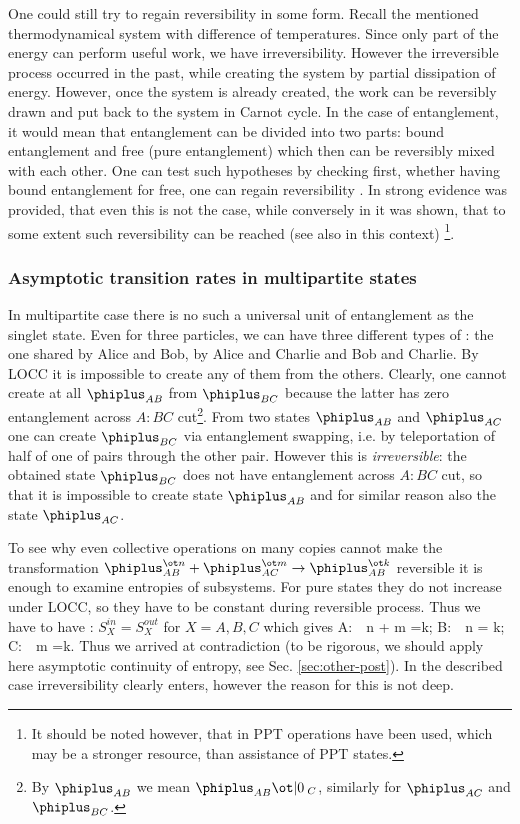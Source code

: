 \documentclass[twocolumn,aps,rmp]{revtex4}
\begin{document}
One could still try to regain reversibility in some form. Recall the
mentioned thermodynamical system with difference of temperatures.
Since only part of the energy can perform useful work, we have
irreversibility. However the irreversible process occurred in the
past, while creating the system by partial dissipation of energy.
However, once the system is already created, the work can be
reversibly drawn and put back to the system in Carnot cycle. In the
case of entanglement, it would mean that entanglement can be divided
into two parts: bound entanglement and free (pure entanglement)
which then can be reversibly mixed with each other. One can test
such hypotheses by checking first, whether having bound entanglement
for free, one can regain reversibility \cite{bound}. In
\cite{thermo-ent2002} strong evidence was provided, that even this
is not the case, while conversely in \cite{AudenaertPE2002-PPT} it
was shown, that to some extent such reversibility can be reached
(see also \cite{Ishizaka04} in this context)
\footnote{It should be noted however, that in \cite{AudenaertPE2002-PPT}
PPT operations have been used, which may be a stronger resource,
than assistance of PPT states.}.


\subsubsection{Asymptotic transition rates in multipartite states}
\label{subsubsec:ghz-epr}
In multipartite case there is no such a universal unit of entanglement as the singlet state.
Even for three particles, we can have three different types of \eprstates:
the one  shared by Alice and Bob, by Alice and Charlie
and Bob and Charlie. By LOCC it is impossible to
create any of them from the others.
Clearly, one cannot create at all $\phiplus_{AB}$ from $\phiplus_{BC}$
because the latter has zero entanglement across $A:BC$ cut\footnote{By $\phiplus_{AB}$
we mean $\phiplus_{AB}\ot |0\>_C$, similarly for $\phiplus_{AC}$ and $\phiplus_{BC}$.}.
From two states $\phiplus_{AB}$ and $\phiplus_{AC}$ one can create
$\phiplus_{BC}$ via entanglement swapping, i.e. by teleportation of half
of one of pairs through the other pair. However this is {\it
irreversible}: the obtained state $\phiplus_{BC}$ does not have
entanglement across $A:BC$ cut, so that it is impossible to create
state $\phiplus_{AB}$ and for similar reason also the state $\phiplus_{AC}$.

To see why even collective operations on many copies cannot make the
transformation $\phiplus_{AB}^{\ot n} + \phiplus_{AC}^{\ot m} \to
\phiplus_{AB}^{\ot k}$ reversible it is enough to examine entropies of
subsystems. For pure states they do not increase under LOCC, so they
have to be constant during reversible process. Thus we have to have
: $S_X^{in} = S_X^{out}$  for $X=A,B,C$ which gives \be A: \,\, n +
m =k; \quad B: \,\, n = k; \quad C: \,\, m =k. \quad \ee Thus we
arrived at contradiction (to be rigorous, we should apply here
asymptotic continuity of entropy, see Sec. \ref{sec:other-post}). In the
described case irreversibility clearly enters, however the reason
for this is not deep.
\end{document}
